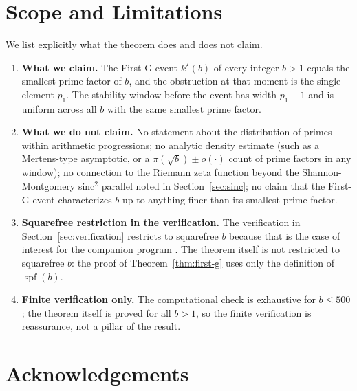 \documentclass[11pt,reqno]{amsart}
\theoremstyle{definition}
\DeclareMathOperator{\spf}{spf}
\begin{document}
\section{Scope and Limitations}
\label{sec:scope}

We list explicitly what the theorem does and does not claim.

\begin{enumerate}[label={\upshape(\arabic*)}]
\item\textbf{What we claim.} The First-G event $k^\star(b)$ of every integer
      $b > 1$ equals the smallest prime factor of $b$, and the obstruction
      at that moment is the single element $p_1$. The stability window
      before the event has width $p_1 - 1$ and is uniform across all $b$
      with the same smallest prime factor.

\item\textbf{What we do not claim.} No statement about the distribution of
      primes within arithmetic progressions; no analytic density estimate
      (such as a Mertens-type asymptotic, or a $\pi(\sqrt{b}) \pm o(\cdot)$
      count of prime factors in any window); no connection to the Riemann
      zeta function beyond the Shannon-Montgomery sinc${}^2$ parallel
      noted in Section~\ref{sec:sinc}; no claim that the First-G event
      characterizes $b$ up to anything finer than its smallest prime
      factor.

\item\textbf{Squarefree restriction in the verification.} The verification
      in Section~\ref{sec:verification} restricts to squarefree $b$ because
      that is the case of interest for the companion program
      \cite{WP35,WP101}. The theorem itself is not restricted to
      squarefree $b$: the proof of Theorem~\ref{thm:first-g} uses only the
      definition of $\spf(b)$.

\item\textbf{Finite verification only.} The computational check is
      exhaustive for $b \le 500$; the theorem itself is proved for all
      $b > 1$, so the finite verification is reassurance, not a pillar
      of the result.
\end{enumerate}

\section*{Acknowledgements}
\end{document}
